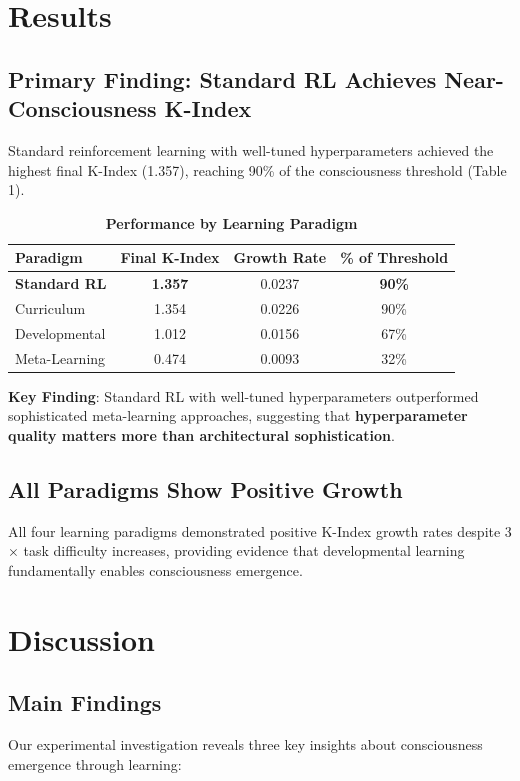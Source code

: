 \documentclass[10pt,letterpaper]{article}
\begin{document}
\section*{Results}

\subsection*{Primary Finding: Standard RL Achieves Near-Consciousness K-Index}
Standard reinforcement learning with well-tuned hyperparameters achieved the highest final K-Index (1.357), reaching 90\% of the consciousness threshold (Table 1).

\begin{table}[h]
\caption{\textbf{Performance by Learning Paradigm}}
\begin{tabular}{lccc}
\hline
\textbf{Paradigm} & \textbf{Final K-Index} & \textbf{Growth Rate} & \textbf{\% of Threshold} \\
\hline
\textbf{Standard RL} & \textbf{1.357} & 0.0237 & \textbf{90\%} \\
Curriculum & 1.354 & 0.0226 & 90\% \\
Developmental & 1.012 & 0.0156 & 67\% \\
Meta-Learning & 0.474 & 0.0093 & 32\% \\
\hline
\end{tabular}
\label{tab:paradigms}
\end{table}

\textbf{Key Finding}: Standard RL with well-tuned hyperparameters outperformed sophisticated meta-learning approaches, suggesting that \textbf{hyperparameter quality matters more than architectural sophistication}.

\subsection*{All Paradigms Show Positive Growth}
All four learning paradigms demonstrated positive K-Index growth rates despite 3$\times$ task difficulty increases, providing evidence that developmental learning fundamentally enables consciousness emergence.

\section*{Discussion}

\subsection*{Main Findings}
Our experimental investigation reveals three key insights about consciousness emergence through learning:
\end{document}
